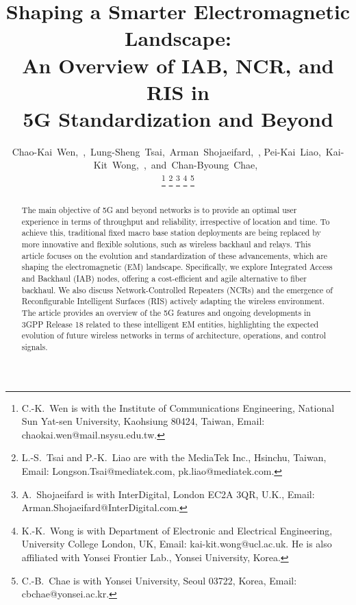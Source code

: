 \documentclass[lettersize,journal]{IEEEtran}
\begin{document}
\title{Shaping a Smarter Electromagnetic Landscape: \\An Overview of IAB, NCR, and RIS in\\ 5G Standardization and Beyond}

\author{Chao-Kai~Wen,~,~Lung-Sheng~Tsai,~Arman~Shojaeifard,~, Pei-Kai~Liao,~Kai-Kit~Wong,~,~and~Chan-Byoung~Chae,~

\thanks{{C.-K.~Wen} is with the Institute of Communications Engineering, National Sun Yat-sen University, Kaohsiung 80424, Taiwan, Email: {\rm chaokai.wen@mail.nsysu.edu.tw}.}
\thanks{{L.-S.~Tsai} and {P.-K.~Liao} are with the MediaTek Inc., Hsinchu, Taiwan, Email: {\rm Longson.Tsai@mediatek.com, pk.liao@mediatek.com}.}
\thanks{{A.~Shojaeifard} is with InterDigital, London EC2A 3QR, U.K., Email: {\rm Arman.Shojaeifard@InterDigital.com}.}
\thanks{{K.-K.~Wong} is with Department of Electronic and Electrical Engineering, University College London, UK, Email: {\rm kai-kit.wong@ucl.ac.uk}. He is also affiliated with Yonsei Frontier Lab., Yonsei University, Korea.}
\thanks{{C.-B.~Chae} is with Yonsei University, Seoul 03722, Korea, Email: {\rm cbchae@yonsei.ac.kr}.}
}



\maketitle


\begin{abstract}

The main objective of 5G and beyond networks is to provide an optimal user experience in terms of throughput and reliability, irrespective of location and time. To achieve this, traditional fixed macro base station deployments are being replaced by more innovative and flexible solutions, such as wireless backhaul and relays. This article focuses on the evolution and standardization of these advancements, which are shaping the electromagnetic (EM) landscape. Specifically, we explore Integrated Access and Backhaul (IAB) nodes, offering a cost-efficient and agile alternative to fiber backhaul. We  also discuss Network-Controlled Repeaters (NCRs) and the emergence of Reconfigurable Intelligent Surfaces (RIS) actively adapting the wireless environment. The article provides an overview of the 5G features and ongoing developments in 3GPP Release 18 related to these intelligent EM entities, highlighting the expected evolution of future wireless networks in terms of architecture, operations, and control signals.
\end{abstract}
\end{document}
